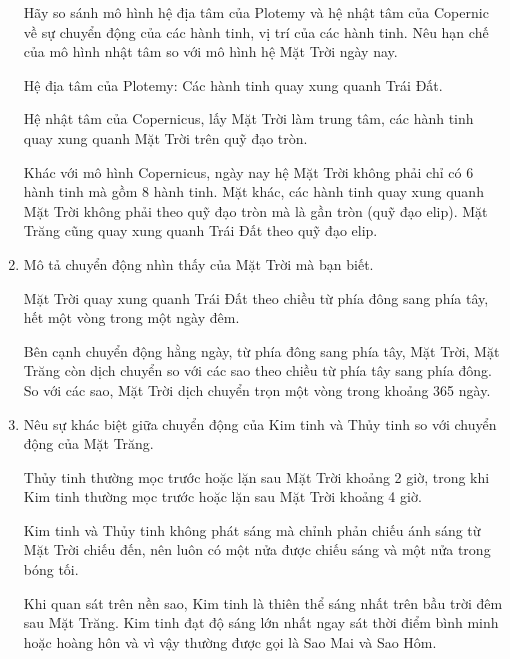 \begin{enumerate}[label=\bfseries Câu \arabic*:]
	{
		Hãy so sánh mô hình hệ địa tâm của Plotemy và hệ nhật tâm của Copernic về sự chuyển động của các hành tinh, vị trí của các hành tinh. Nêu hạn chế của mô hình nhật tâm so với mô hình hệ Mặt Trời ngày nay.
	}
	
	\hideall
	{
		Hệ địa tâm của Plotemy: Các hành tinh quay xung quanh Trái Đất.
		
		Hệ nhật tâm của Copernicus, lấy Mặt Trời làm trung tâm, các hành tinh quay xung quanh Mặt Trời trên quỹ đạo tròn.
		
		Khác với mô hình Copernicus, ngày nay hệ Mặt Trời không phải chỉ có 6 hành tinh mà gồm 8 hành tinh. Mặt khác, các hành tinh quay xung quanh Mặt Trời không phải theo quỹ đạo tròn mà là gần tròn (quỹ đạo elip). Mặt Trăng cũng quay xung quanh Trái Đất theo quỹ đạo elip.
	}
	\item {}
	

	{
		Mô tả chuyển động nhìn thấy của Mặt Trời mà bạn biết.
	}
	
	\hideall
	{
		Mặt Trời quay xung quanh Trái Đất theo chiều từ phía đông sang phía tây, hết một vòng trong một ngày đêm.
		
		Bên cạnh chuyển động hằng ngày, từ phía đông sang phía tây, Mặt Trời, Mặt Trăng còn dịch chuyển so với các sao theo chiều từ phía tây sang phía đông. So với các sao, Mặt Trời dịch chuyển trọn một vòng trong khoảng 365 ngày.
		
	}
	\item {}
	
	
	{
		Nêu sự khác biệt giữa chuyển động của Kim tinh và Thủy tinh so với chuyển động của Mặt Trăng. 
	}
	
	\hideall
	{
		Thủy tinh thường mọc trước hoặc lặn sau Mặt Trời khoảng 2 giờ, trong khi Kim tinh thường mọc trước hoặc lặn sau Mặt Trời khoảng 4 giờ. 
		
		Kim tinh và Thủy tinh không phát sáng mà chỉnh phản chiếu ánh sáng từ Mặt Trời chiếu đến, nên luôn có một nửa được chiếu sáng và một nửa trong bóng tối. 
		
		Khi quan sát trên nền sao, Kim tinh là thiên thể sáng nhất trên bầu trời đêm sau Mặt Trăng. Kim tinh đạt độ sáng lớn nhất ngay sát thời điểm bình minh hoặc hoàng hôn và vì vậy thường được gọi là Sao Mai và Sao Hôm.
	}
\end{enumerate}
